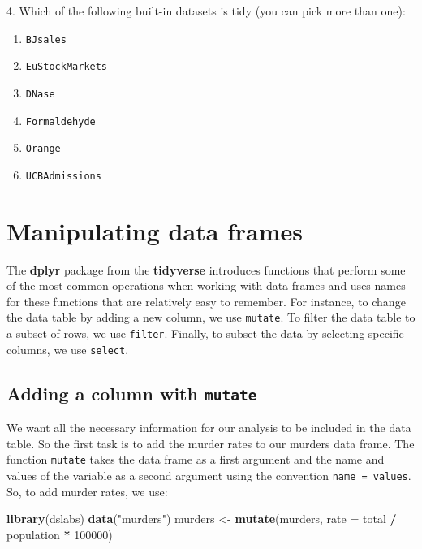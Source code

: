 \documentclass[
]{krantz}
\newenvironment{Shaded}{\begin{snugshade}}{\end{snugshade}}
\newcommand{\DataTypeTok}[1]{\textcolor[rgb]{0.27,0.27,0.27}{#1}}
\newcommand{\DecValTok}[1]{\textcolor[rgb]{0.06,0.06,0.06}{#1}}
\newcommand{\KeywordTok}[1]{\textcolor[rgb]{0.27,0.27,0.27}{\textbf{#1}}}
\newcommand{\NormalTok}[1]{#1}
\newcommand{\OperatorTok}[1]{\textcolor[rgb]{0.43,0.43,0.43}{\textbf{#1}}}
\newcommand{\StringTok}[1]{\textcolor[rgb]{0.5,0.5,0.5}{#1}}
\providecommand{\tightlist}{%
  \setlength{\itemsep}{0pt}\setlength{\parskip}{0pt}}
\begin{document}
4. Which of the following built-in datasets is tidy (you can pick more than one):

\begin{enumerate}
\def\labelenumi{\alph{enumi}.}
\tightlist
\item
  \texttt{BJsales}
\item
  \texttt{EuStockMarkets}
\item
  \texttt{DNase}
\item
  \texttt{Formaldehyde}
\item
  \texttt{Orange}
\item
  \texttt{UCBAdmissions}
\end{enumerate}

\hypertarget{manipulating-data-frames}{%
\section{Manipulating data frames}\label{manipulating-data-frames}}

The \textbf{dplyr} package from the \textbf{tidyverse} introduces functions that perform some of the most common operations when working with data frames and uses names for these functions that are relatively easy to remember. For instance, to change the data table by adding a new column, we use \texttt{mutate}. To filter the data table to a subset of rows, we use \texttt{filter}. Finally, to subset the data by selecting specific columns, we use \texttt{select}.

\hypertarget{adding-a-column-with-mutate}{%
\subsection{\texorpdfstring{Adding a column with \texttt{mutate}}{Adding a column with mutate}}\label{adding-a-column-with-mutate}}

We want all the necessary information for our analysis to be included in the data table. So the first task is to add the murder rates to our murders data frame. The function \texttt{mutate} takes the data frame as a first argument and the name and values of the variable as a second argument using the convention \texttt{name\ =\ values}. So, to add murder rates, we use:

\begin{Shaded}
\begin{Highlighting}[]
\KeywordTok{library}\NormalTok{(dslabs)}
\KeywordTok{data}\NormalTok{(}\StringTok{"murders"}\NormalTok{)}
\NormalTok{murders <-}\StringTok{ }\KeywordTok{mutate}\NormalTok{(murders, }\DataTypeTok{rate =}\NormalTok{ total }\OperatorTok{/}\StringTok{ }\NormalTok{population }\OperatorTok{*}\StringTok{ }\DecValTok{100000}\NormalTok{)}
\end{Highlighting}
\end{Shaded}
\end{document}

